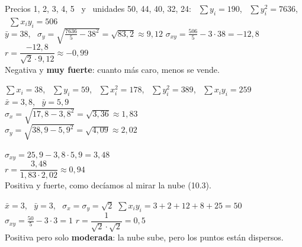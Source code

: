 \documentclass[11pt,a4paper]{article}
\newcommand{\nuvol}[4]{\draw[fmmuted!25] (0,0) grid (#1,#2);
  \draw[-{Latex[length=2mm]},fmmuted,line width=0.8pt] (0,0) -- (#1+0.6,0) node[right,font=\scriptsize] {#3};
  \draw[-{Latex[length=2mm]},fmmuted,line width=0.8pt] (0,0) -- (0,#2+0.6) node[above,font=\scriptsize] {#4};}
\newcommand{\pnt}[1]{\fill[fmblue] #1 circle (3pt);}
\begin{document}
\vfill
\begin{exemple}
Precios 1, 2, 3, 4, 5 \ y \ unidades 50, 44, 40, 32, 24: \ $\sum y_i=190$, \ $\sum y_i^2=7636$, \ $\sum x_iy_i=506$\\[4pt]
$\bar y=38$, \ $\sigma_y=\sqrt{\frac{7636}5-38^2}=\sqrt{83{,}2}\approx9{,}12$ \qquad $\sigma_{xy}=\frac{506}5-3\cdot38=-12{,}8$ \qquad $r=\dfrac{-12{,}8}{\sqrt2\cdot9{,}12}\approx\boxed{-0{,}99}$\\[3pt]
Negativa y \textbf{muy fuerte}: cuanto más caro, menos se vende.
\end{exemple}

\vfill
\begin{exemple}
\begin{minipage}[c]{0.5\linewidth}
$\sum x_i=38$, \ $\sum y_i=59$, \ $\sum x_i^2=178$, \ $\sum y_i^2=389$, \ $\sum x_iy_i=259$\\[4pt]
$\bar x=3{,}8$, \ $\bar y=5{,}9$\\[3pt]
$\sigma_x=\sqrt{17{,}8-3{,}8^2}=\sqrt{3{,}36}\approx1{,}83$\\[3pt]
$\sigma_y=\sqrt{38{,}9-5{,}9^2}=\sqrt{4{,}09}\approx2{,}02$
\end{minipage}\hfill
\begin{minipage}[c]{0.47\linewidth}
$\sigma_{xy}=25{,}9-3{,}8\cdot5{,}9=3{,}48$\\[4pt]
$r=\dfrac{3{,}48}{1{,}83\cdot2{,}02}\approx\boxed{0{,}94}$\\[4pt]
Positiva y fuerte, como decíamos al mirar la nube (10.3).
\end{minipage}
\end{exemple}

\vfill
\begin{exemple}[Ejemplo: \ $x_i$: 1, 2, 3, 4, 5 \ e \ $y_i$: 3, 1, 4, 2, 5]
\begin{minipage}[c]{0.3\linewidth}\centering
{}
\end{minipage}\hfill
\begin{minipage}[c]{0.67\linewidth}
$\bar x=3$, \ $\bar y=3$, \ $\sigma_x=\sigma_y=\sqrt2$ \qquad $\sum x_iy_i=3+2+12+8+25=50$\\[4pt]
$\sigma_{xy}=\frac{50}5-3\cdot3=1$ \qquad $r=\dfrac{1}{\sqrt2\cdot\sqrt2}=\boxed{0{,}5}$\\[4pt]
Positiva pero solo \textbf{moderada}: la nube sube, pero los puntos están dispersos.
\end{minipage}
\end{exemple}
\end{document}
